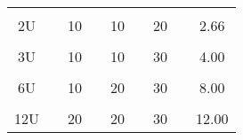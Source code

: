 \begin{table}[htp]
\begin{center}
\begin{tabular}{clclclclc}
\multicolumn{1}{l}{} &  & \multicolumn{1}{l}{}                                 &  & \multicolumn{1}{l}{}                                 &  & \multicolumn{1}{l}{}                                 &  & \multicolumn{1}{l}{}                                \\
2U                   &  & 10                                                   &  & 10                                                   &  & 20                                                   &  & 2.66                                                \\
\multicolumn{1}{l}{} &  & \multicolumn{1}{l}{}                                 &  & \multicolumn{1}{l}{}                                 &  & \multicolumn{1}{l}{}                                 &  & \multicolumn{1}{l}{}                                \\
3U                   &  & 10                                                   &  & 10                                                   &  & 30                                                   &  & 4.00                                                \\
\multicolumn{1}{l}{} &  & \multicolumn{1}{l}{}                                 &  & \multicolumn{1}{l}{}                                 &  & \multicolumn{1}{l}{}                                 &  & \multicolumn{1}{l}{}                                \\
6U                   &  & 10                                                   &  & 20                                                   &  & 30                                                   &  & 8.00                                                \\
\multicolumn{1}{l}{} &  & \multicolumn{1}{l}{}                                 &  & \multicolumn{1}{l}{}                                 &  & \multicolumn{1}{l}{}                                 &  & \multicolumn{1}{l}{}                                \\
12U                  &  & 20                                                   &  & 20                                                   &  & 30                                                   &  & 12.00                                               \\ \hline
\end{tabular}
\end{center}
\end{table}